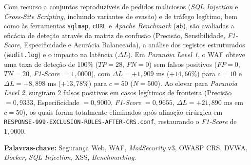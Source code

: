 \documentclass[11pt,a4paper]{article}
\begin{document}
Com recurso a conjuntos reproduzíveis de pedidos maliciosos (\textit{SQL Injection} e \textit{Cross-Site Scripting}, incluindo variantes de evasão) e de tráfego legítimo, bem como às ferramentas \texttt{sqlmap}, \texttt{cURL} e \textit{Apache Benchmark} (\texttt{ab}), são avaliadas a eficácia de deteção através da matriz de confusão (Precisão, Sensibilidade, \textit{F1-Score}, Especificidade e Acurácia Balanceada), a análise dos registos estruturados (\texttt{audit.log}) e o impacto na latência ($\Delta L$). Em \textit{Paranoia Level 1}, o WAF obteve uma taxa de deteção de 100\% ($TP = 28$, $FN = 0$) sem falsos positivos ($FP = 0$, $TN = 20$, \textit{F1-Score} $= 1{,}0000$), com $\Delta L = +1{,}909\text{ ms}$ ($+14{,}66\%$) para $c = 10$ e $\Delta L = +8{,}898\text{ ms}$ ($+13{,}78\%$) para $c = 50$ ($N = 500$). Ao elevar para \textit{Paranoia Level 2}, surgiram 2 falsos positivos em casos legítimos de fronteira (Precisão $= 0{,}9333$, Especificidade $= 0{,}9000$, \textit{F1-Score} $= 0{,}9655$, $\Delta L = +21{,}890\text{ ms}$ em $c = 50$), os quais foram totalmente eliminados após afinação cirúrgica em \texttt{RESPONSE-999-EXCLUSION-RULES-AFTER-CRS.conf}, restaurando o \textit{F1-Score} de $1{,}0000$.

\vspace{0.8cm}
\noindent \textbf{Palavras-chave:} Segurança Web, WAF, \textit{ModSecurity} v3, OWASP CRS, DVWA, \textit{Docker}, \textit{SQL Injection}, XSS, \textit{Benchmarking}.

\clearpage
\tableofcontents

\clearpage
\end{document}
